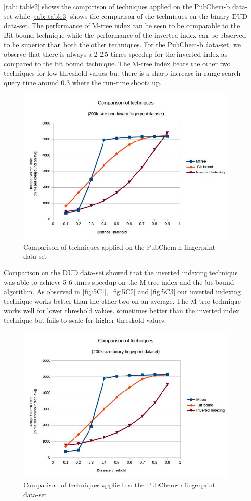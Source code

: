 \autoref{tab: table2} shows the comparison of techniques applied on the PubChem-b data-set while \autoref{tab: table3} shows the comparison of the techniques on the binary DUD data-set. The performance of M-tree index can be seen to be comparable to the Bit-bound technique while the performance of the inverted index can be observed to be superior than both the other techniques. For the PubChem-b data-set, we observe that there is always a 2-2.5 times speedup for the inverted index as compared to the bit bound technique. The M-tree index beats the other two techniques for low threshold values but there is a sharp increase in range search query time around 0.3 where the run-time shoots up.


\begin{figure}[ht!]	
\centering
\includegraphics[width=0.75 \columnwidth]{img/imageC1.jpg}
\caption{Comparison of techniques applied on the PubChem-n fingerprint data-set}
\label{fig:5C1}
\end{figure}


Comparison on the DUD data-set showed that the inverted indexing technique was able to achieve 5-6 times speedup on the M-tree index and the bit bound algorithm. As observed in \autoref{fig:5C1}, \autoref{fig:5C2} and \autoref{fig:5C3} our inverted indexing technique works better than the other two on an average. The M-tree technique works well for lower threshold values, sometimes better than the inverted index technique but fails to scale for higher threshold values. 



\begin{figure}[ht]	
\centering
\includegraphics[width=0.75 \columnwidth]{img/imageC2.jpg}
\caption{Comparison of techniques applied on the PubChem-b fingerprint data-set}
\label{fig:5C2}
\end{figure}

